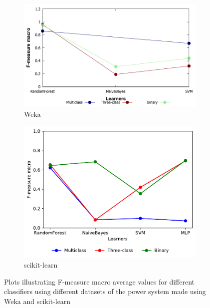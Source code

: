 \begin{figure}[H]
    \centering
    \begin{subfigure}[t]{110mm}
        \includegraphics[width=\linewidth]{images/weka_f1macro}
        \caption{Weka}
    \end{subfigure}
    \begin{subfigure}[t]{110mm}
        \includegraphics[width=\linewidth, page = 2]{images/fmeasure}
        \caption{scikit-learn}
    \end{subfigure}
    \caption{Plots illustrating F-measure macro average values for different classifiers using different datasets of the power system made using Weka and scikit-learn}
    \label{fig:f1_macro}
\end{figure}


